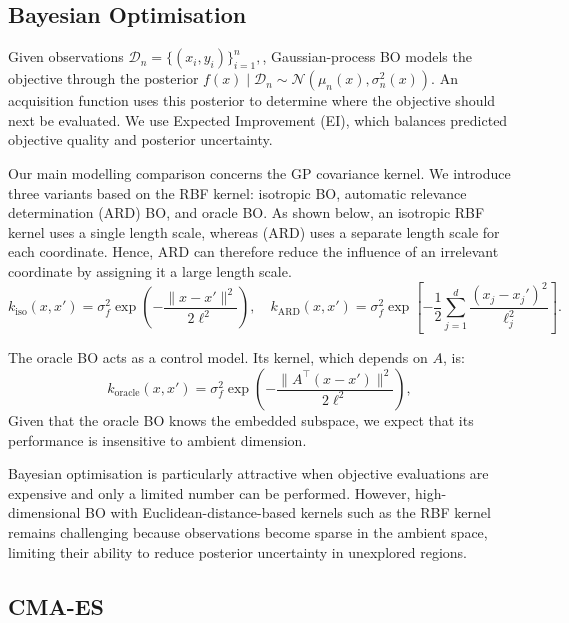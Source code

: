 \documentclass[10pt]{article}
\begin{document}
\subsection{Bayesian Optimisation}

Given observations
$
    \mathcal{D}_n = \{(x_i,y_i)\}_{i=1}^{n},
$, 
Gaussian-process BO models the objective through the posterior
$
    f(x)\mid\mathcal{D}_n
    \sim
    \mathcal{N}\!\left(\mu_n(x),\sigma_n^2(x)\right).
$
An acquisition function uses this posterior to determine where the objective should next be evaluated. We use Expected Improvement (EI), which balances predicted objective quality and posterior uncertainty.

Our main modelling comparison concerns the GP covariance kernel. We introduce three variants based on the RBF kernel: isotropic BO, automatic relevance determination (ARD) BO, and oracle BO. As shown below, an isotropic RBF kernel uses a single length scale, whereas (ARD) uses a separate length scale for each coordinate. Hence, ARD can therefore reduce the influence of an irrelevant coordinate by assigning it a large length scale.
\begin{equation}
    k_{\mathrm{iso}}(x,x')
    =
    \sigma_f^2
    \exp\left(
        -\frac{\|x-x'\|^2}{2\ell^2}
    \right),
    \quad
    k_{\mathrm{ARD}}(x,x')
    =
    \sigma_f^2
    \exp\left[
        -\frac{1}{2}
        \sum_{j=1}^{d}
        \frac{(x_j-x_j')^2}{\ell_j^2}
    \right].
\end{equation}

The oracle BO acts as a control model. Its kernel, which depends on $A$, is:
\begin{equation}
    k_{\mathrm{oracle}}(x,x')
    =
    \sigma_f^2
    \exp\left(
        -\frac{\|A^\top (x-x')\|^2}{2\ell^2}
    \right),
\end{equation}
Given that the oracle BO knows the embedded subspace, we expect that its performance is insensitive to ambient dimension. 

Bayesian optimisation is particularly attractive when objective evaluations are expensive and only a limited number can be performed. However, high-dimensional BO with Euclidean-distance-based kernels such as the RBF kernel remains challenging because observations become sparse in the ambient space, limiting their ability to reduce posterior uncertainty in unexplored regions. 

\subsection{CMA-ES}
\end{document}
